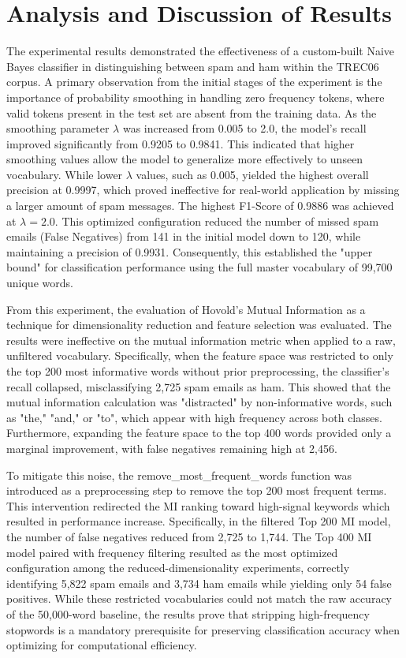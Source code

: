 \documentclass{acm_proc_article-sp}
\begin{document}
\section{Analysis and Discussion of Results}
The experimental results demonstrated the effectiveness of a custom-built Naive Bayes classifier in distinguishing between spam and ham within the TREC06 corpus. A primary observation from the initial stages of the experiment is the importance of probability smoothing in handling zero frequency tokens, where valid tokens present in the test set are absent from the training data. As the smoothing parameter $\lambda$ was increased from 0.005 to 2.0, the model's recall improved significantly from 0.9205 to 0.9841. This indicated that higher smoothing values allow the model to generalize more effectively to unseen vocabulary. While lower $\lambda$ values, such as 0.005, yielded the highest overall precision at 0.9997, which proved ineffective for real-world application by missing a larger amount of spam messages. The highest F1-Score of 0.9886 was achieved at $\lambda=2.0$. This optimized configuration reduced the number of missed spam emails (False Negatives) from 141 in the initial model down to 120, while maintaining a precision of 0.9931. Consequently, this established the "upper bound" for classification performance using the full master vocabulary of 99,700 unique words.

From this experiment, the evaluation of Hovold’s Mutual Information as a technique for dimensionality reduction and feature selection was evaluated. The results were ineffective on the mutual information metric when applied to a raw, unfiltered vocabulary. Specifically, when the feature space was restricted to only the top 200 most informative words without prior preprocessing, the classifier’s recall collapsed, misclassifying 2,725 spam emails as ham. This showed that the mutual information calculation was "distracted" by non-informative words, such as "the," "and," or "to", which appear with high frequency across both classes. Furthermore, expanding the feature space to the top 400 words provided only a marginal improvement, with false negatives remaining high at 2,456.

To mitigate this noise, the remove\_most\_frequent\_words function was introduced as a preprocessing step to remove the top 200 most frequent terms. This intervention redirected the MI ranking toward high-signal keywords which resulted in performance increase. Specifically, in the filtered Top 200 MI model, the number of false negatives reduced from 2,725 to 1,744. The Top 400 MI model paired with frequency filtering resulted as the most optimized configuration among the reduced-dimensionality experiments, correctly identifying 5,822 spam emails and 3,734 ham emails while yielding only 54 false positives. While these restricted vocabularies could not match the raw accuracy of the 50,000-word baseline, the results prove that stripping high-frequency stopwords is a mandatory prerequisite for preserving classification accuracy when optimizing for computational efficiency.
\end{document}
